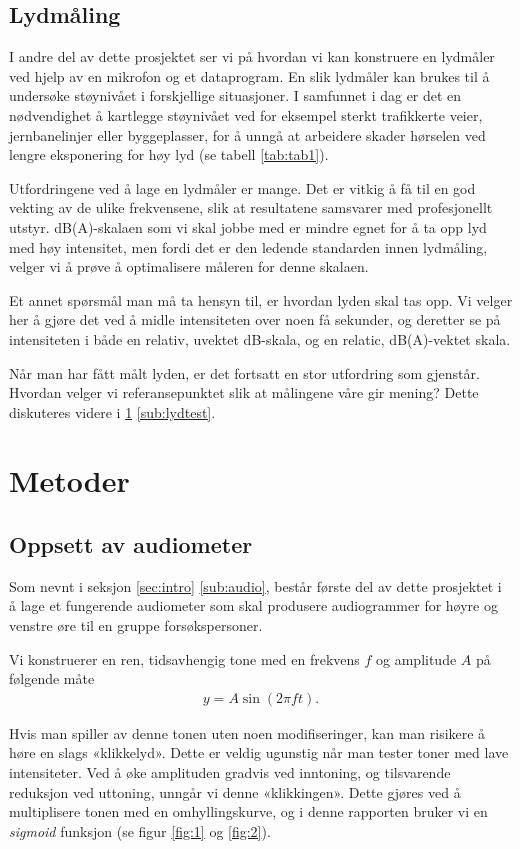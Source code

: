 \documentclass[norsk, twocolumn,letterpaper,11pt,fleqn]{extarticle}
\newcommand{\equ}[1]{{\small\begin{align}#1\end{align}}}
\begin{document}
\subsection{Lydmåling} 
\label{sub:lydmål}
I andre del av dette prosjektet ser vi på hvordan vi kan konstruere en lydmåler
ved hjelp av en mikrofon og et dataprogram. En slik lydmåler kan brukes til 
å undersøke støynivået i forskjellige situasjoner. I samfunnet i dag er det
en nødvendighet å kartlegge støynivået ved for eksempel sterkt trafikkerte veier,
jernbanelinjer eller byggeplasser, 
for å unngå at arbeidere skader hørselen ved lengre eksponering for høy lyd 
(se tabell \ref{tab:tab1}).

Utfordringene ved å lage en lydmåler er mange. Det er vitkig å få til en god vekting av
de ulike frekvensene, slik at resultatene samsvarer med profesjonellt utstyr. 
dB(A)-skalaen som vi skal jobbe med er mindre egnet for å ta opp lyd med høy intensitet,
men fordi det er den ledende standarden innen lydmåling, 
velger vi å prøve å optimalisere måleren for denne skalaen.

Et annet spørsmål man må ta hensyn til, er hvordan lyden skal tas opp.
Vi velger her å gjøre det ved å midle intensiteten over noen få sekunder,
og deretter se på intensiteten i både en relativ, uvektet dB-skala, 
og en relatic, dB(A)-vektet skala.

Når man har fått målt lyden, er det fortsatt en stor utfordring som gjenstår.
Hvordan velger vi referansepunktet slik at målingene våre gir mening?
Dette diskuteres videre i \ref{sec:met} \ref{sub:lydtest}.

\section{Metoder}
\label{sec:met}
\subsection{Oppsett av audiometer}
\label{sub:audiometer}
Som nevnt i seksjon \ref{sec:intro} \ref{sub:audio}, består første del av dette prosjektet
i å lage et fungerende audiometer som skal produsere audiogrammer for høyre og venstre øre
til en gruppe forsøkspersoner. 

Vi konstruerer en ren, tidsavhengig tone med en frekvens $f$ og amplitude $A$ på følgende måte
\equ{
	y = A\sin(2 \pi f t).}

Hvis man spiller av denne tonen uten noen modifiseringer, kan man risikere å høre en slags
«klikkelyd». Dette er veldig ugunstig når man tester toner med lave intensiteter.
Ved å øke amplituden gradvis ved inntoning, og tilsvarende reduksjon ved uttoning,
unngår vi denne «klikkingen». Dette gjøres ved å multiplisere tonen 
med en omhyllingskurve, og i denne rapporten bruker vi en 
\textit{sigmoid} funksjon (se figur \ref{fig:1} og \ref{fig:2}).
\end{document}
